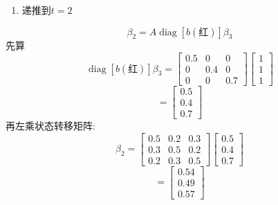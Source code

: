 \begin{enumerate}
\item[2.] 递推到$t=2$
\end{enumerate}
\[
\beta_2 = A \operatorname{diag}[b(\text{红})] \beta_3
\]
先算
\[
\operatorname{diag}[b(\text{红})] \beta_3
    =
    \begin{bmatrix}0.5 & 0 & 0 \\ 0 & 0.4 & 0 \\ 0 & 0 & 0.7\end{bmatrix}
    \begin{bmatrix}1 \\ 1 \\ 1\end{bmatrix}
\]
\[
= \begin{bmatrix}0.5 \\ 0.4 \\ 0.7\end{bmatrix}
\]
再左乘状态转移矩阵:
\[
\beta_2
    =
    \begin{bmatrix}0.5 & 0.2 & 0.3 \\ 0.3 & 0.5 & 0.2 \\ 0.2 & 0.3 & 0.5\end{bmatrix}
    \begin{bmatrix}0.5 \\ 0.4 \\ 0.7\end{bmatrix}
\]
\[
= \begin{bmatrix}0.54 \\ 0.49 \\ 0.57\end{bmatrix}
\]

